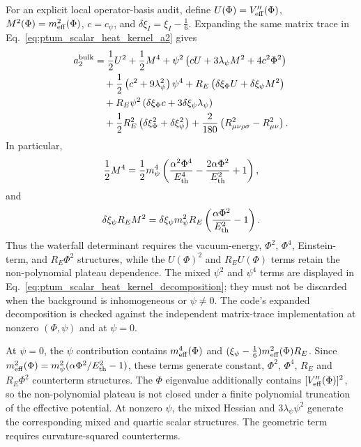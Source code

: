 \documentclass[epj]{svjour}
\begin{document}
For an explicit local operator-basis audit, define
$U(\Phi)=V_{\rm eff}''(\Phi)$,
$M^2(\Phi)=m_{\rm eff}^2(\Phi)$,
$c=c_\psi$, and $\delta\xi_I=\xi_I-\tfrac16$. Expanding the same
matrix trace in Eq.~\eqref{eq:ptum_scalar_heat_kernel_a2} gives
\begin{align}
a_2^{\rm bulk}
&=\frac12U^2+\frac12M^4
+\psi^2\left(cU+3\lambda_\psi M^2+4c^2\Phi^2\right)
\nonumber\\
&\quad+\frac12\left(c^2+9\lambda_\psi^2\right)\psi^4
+R_E\left(\delta\xi_\Phi U+\delta\xi_\psi M^2\right)
\nonumber\\
&\quad+R_E\psi^2\left(\delta\xi_\Phi c
+3\delta\xi_\psi\lambda_\psi\right)
\nonumber\\
&\quad+\frac12R_E^2
\left(\delta\xi_\Phi^2+\delta\xi_\psi^2\right)
+\frac{2}{180}
\left(R_{\mu\nu\rho\sigma}^2-R_{\mu\nu}^2\right).
\label{eq:ptum_scalar_heat_kernel_decomposition}
\end{align}
In particular,
\begin{equation}
\frac12M^4
=\frac12m_\psi^4
\left(
\frac{\alpha^2\Phi^4}{E_{\rm th}^4}
-\frac{2\alpha\Phi^2}{E_{\rm th}^2}+1
\right),
\end{equation}
and
\begin{equation}
\delta\xi_\psi R_E M^2
=\delta\xi_\psi m_\psi^2R_E
\left(\frac{\alpha\Phi^2}{E_{\rm th}^2}-1\right).
\end{equation}
Thus the waterfall determinant requires the vacuum-energy, $\Phi^2$,
$\Phi^4$, Einstein-term, and $R_E\Phi^2$ structures, while the
$U(\Phi)^2$ and $R_EU(\Phi)$ terms retain the non-polynomial plateau
dependence. The mixed $\psi^2$ and $\psi^4$ terms are displayed in
Eq.~\eqref{eq:ptum_scalar_heat_kernel_decomposition}; they must not be
discarded when the background is inhomogeneous or $\psi\ne0$.
The code's expanded decomposition is checked against the independent
matrix-trace implementation at nonzero $(\Phi,\psi)$ and at $\psi=0$.


At $\psi=0$, the $\psi$ contribution contains
$m_{\rm eff}^4(\Phi)$ and
$(\xi_\psi-\tfrac16)m_{\rm eff}^2(\Phi)R_E$. Since
$m_{\rm eff}^2(\Phi)=m_\psi^2(\alpha\Phi^2/E_{\rm th}^2-1)$,
these terms generate constant, $\Phi^2$, $\Phi^4$, $R_E$ and
$R_E\Phi^2$ counterterm structures. The $\Phi$ eigenvalue additionally
contains $[V_{\rm eff}''(\Phi)]^2$, so the non-polynomial plateau is
not closed under a finite polynomial truncation of the effective
potential. At nonzero $\psi$, the mixed Hessian and
$3\lambda_\psi\psi^2$ generate the corresponding mixed and quartic
scalar structures. The geometric term requires curvature-squared
counterterms.
\end{document}
